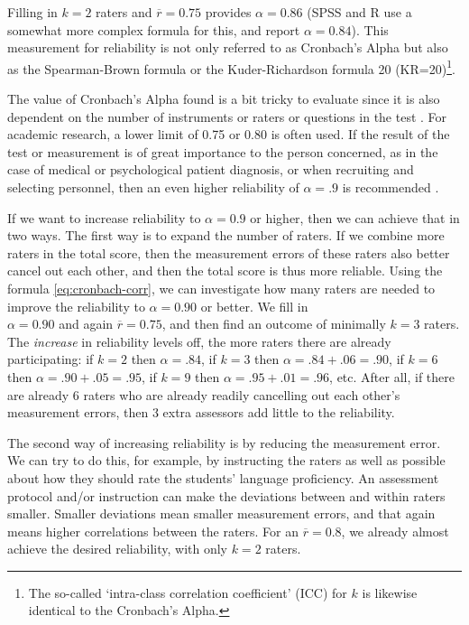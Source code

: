 \documentclass[
]{book}
\begin{document}
Filling in \(k=2\) raters and \(\overline{r}=0.75\) provides \(\alpha=0.86\) (SPSS and R
use a somewhat more complex formula for this, and report
\(\alpha=0.84\)). This measurement for reliability is not only referred to
as Cronbach's Alpha but also as the Spearman-Brown formula
or the Kuder-Richardson formula 20 (KR=20)\footnote{The so-called `intra-class correlation coefficient' (ICC) for \(k\)
  is likewise identical to the Cronbach's Alpha.}.

The value of Cronbach's Alpha found is a bit tricky to evaluate
since it is also dependent on the number of instruments or raters or
questions in the test \citep{Cort93, Glin01}. For academic research,
a lower limit of 0.75 or 0.80 is often used. If the result of the test or measurement
is of great importance to the person concerned, as in the case of medical or
psychological patient diagnosis, or when recruiting and selecting personnel, then
an even higher reliability of \(\alpha=.9\) is recommended \citep{Glin01}.

If we want to increase reliability to \(\alpha=0.9\) or higher, then
we can achieve that in two ways. The first way is to expand the
number of raters. If we combine more raters in the total score,
then the measurement errors of these raters also better cancel out each other,
and then the total score is thus more reliable. Using
the formula \eqref{eq:cronbach-corr}, we can investigate how many raters
are needed to improve the reliability to \(\alpha=0.90\) or better. We fill in\\
\(\alpha=0.90\) and again \(\overline{r}=0.75\), and then find an outcome of
minimally \(k=3\) raters. The \emph{increase} in reliability levels off, the more
raters there are already participating: if \(k=2\) then \(\alpha=.84\), if \(k=3\) then
\(\alpha=.84+.06=.90\), if \(k=6\) then \(\alpha=.90+.05=.95\), if \(k=9\) then
\(\alpha=.95+.01=.96\), etc. After all, if there are already 6 raters who are
already readily cancelling out each other's measurement errors, then 3 extra
assessors add little to the reliability.

The second way of increasing reliability is by reducing the measurement
error. We can try to do this, for example, by instructing the raters as well as
possible
about how they should rate the students' language proficiency. An assessment
protocol and/or
instruction can make the deviations between and within raters smaller.
Smaller deviations mean smaller measurement errors, and that again means
higher correlations between the raters. For an
\(\overline{r}=0.8\), we already almost achieve the desired reliability, with
only \(k=2\) raters.
\end{document}
